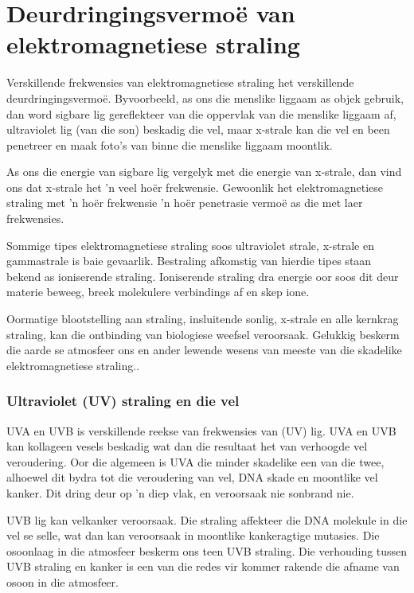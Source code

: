 \section{Deurdringingsvermo\"e van elektromagnetiese straling}
\nopagebreak
Verskillende frekwensies van e\-lek\-tro\-mag\-ne\-tie\-se straling het verskillende deurdringingsvermo\"e. Byvoorbeeld, as ons die menslike liggaam as objek gebruik, dan word sigbare lig gereflekteer van die oppervlak van die menslike liggaam af, ultraviolet lig (van die son) beskadig die vel, maar x-strale kan die vel en been penetreer en maak foto's van binne die menslike liggaam moontlik. \par 

As ons die energie van sigbare lig vergelyk met die energie van x-strale, dan vind ons dat x-strale het 'n veel ho\"er frekwensie. Gewoonlik het elektromagnetiese straling met 'n ho\"er frekwensie 'n ho\"er penetrasie vermo\"e as die met laer frekwensies. \par 

Sommige tipes elektromagnetiese straling soos ultraviolet strale, x-strale en gammastrale is baie gevaarlik. Bestraling afkomstig van hierdie tipes staan bekend as ioniserende straling. Ioniserende straling dra energie oor soos dit deur materie beweeg, breek molekulere verbindings af en skep ione. \par 

Oormatige blootstelling aan straling, insluitende sonlig, x-strale en alle kernkrag straling, kan die ontbinding van biologiese weefsel veroorsaak. Gelukkig beskerm die aarde se atmosfeer ons en ander lewende wesens van meeste van die skadelike e\-lek\-tro\-mag\-ne\-tie\-se straling..\par 

            \subsubsection*{Ultraviolet (UV) straling en die vel}
            \nopagebreak
        \label{m38779*id189482} UVA en UVB is verskillende reekse van frekwensies van (UV) lig. UVA en UVB kan kollageen vesels beskadig wat dan die resultaat het van verhoogde vel veroudering. Oor die algemeen is UVA die minder skadelike een van die twee, alhoewel dit bydra tot die veroudering van vel, DNA skade en moontlike vel kanker. Dit dring deur op 'n diep vlak, en veroorsaak nie sonbrand nie. \par 
        \label{m38779*id189490}UVB lig kan velkanker veroorsaak. Die straling affekteer die DNA molekule in die vel se selle, wat dan kan veroorsaak in moontlike kankeragtige mutasies. Die osoonlaag in die atmosfeer beskerm ons teen UVB straling. Die verhouding tussen UVB straling en kanker is een van die redes vir kommer rakende die afname van osoon in die atmosfeer. \par 
        
